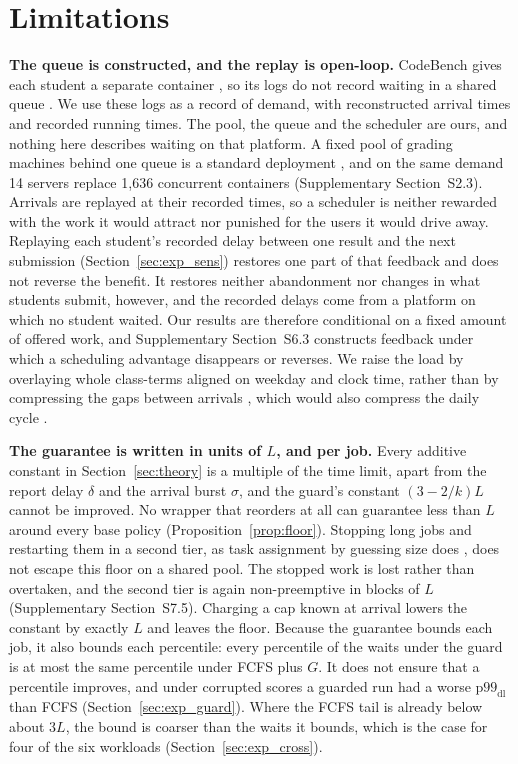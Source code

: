\providecommand{\devnum}[1]{#1}

\section{Limitations}
\label{sec:limits}

\textbf{The queue is constructed, and the replay is open-loop.} CodeBench gives each student
a separate container \cite{codebench_home}, so its logs do not record waiting in a shared
queue \cite{codebench_dataset}. We use these logs as a record of demand, with reconstructed
arrival times and recorded running times. The pool, the queue and the scheduler are ours,
and nothing here describes waiting on that platform. A fixed pool of grading machines behind
one queue is a standard deployment \cite{domjudge_manual,peveler2019sandbox}, and on the
same demand \devnum{14} servers replace \devnum{1{,}636} concurrent containers
\cite{smith1981pooling} (Supplementary Section~S2.3). Arrivals are replayed at their
recorded times, so a scheduler is neither rewarded with the work it would attract nor
punished for the users it would drive away. Replaying each student's recorded delay between
one result and the next submission (Section~\ref{sec:exp_sens}) restores one part of that
feedback and does not reverse the benefit. It restores neither abandonment nor changes in
what students submit, however, and the recorded delays come from a platform on which no
student waited. Our results are therefore conditional on a fixed amount of offered work,
and Supplementary Section~S6.3 constructs feedback under which a scheduling advantage
disappears or reverses. We raise the load by overlaying whole class-terms aligned on
weekday and clock time, rather than by compressing the gaps between arrivals
\cite{harcholbalter2003sizebased}, which would also compress the daily cycle
\cite{feitelson2021resampling}.

\textbf{The guarantee is written in units of $L$, and per job.} Every additive constant in
Section~\ref{sec:theory} is a multiple of the time limit, apart from the report delay
$\delta$ and the arrival burst $\sigma$, and the guard's constant $(3-2/k)L$ cannot be
improved. No wrapper that reorders at all can guarantee less than $L$ around every base
policy (Proposition~\ref{prop:floor}). Stopping long jobs and restarting them in a second
tier, as task assignment by guessing size does \cite{harcholbalter2002tags}, does not
escape this floor on a shared pool. The stopped work is lost rather than overtaken, and the
second tier is again non-preemptive in blocks of $L$ (Supplementary Section~S7.5).
Charging a cap known at arrival lowers the constant by exactly $L$ and leaves the floor.
Because the guarantee bounds each job, it also bounds each percentile: every percentile of
the waits under the guard is at most the same percentile under FCFS plus $G$. It does not ensure that a percentile
improves, and under corrupted scores a guarded run had a worse
$\mathrm{p99}_{\mathrm{dl}}$ than FCFS (Section~\ref{sec:exp_guard}). Where the FCFS tail is
already below about $3L$, the bound is coarser than the waits it bounds, which is the case
for four of the six workloads (Section~\ref{sec:exp_cross}).

